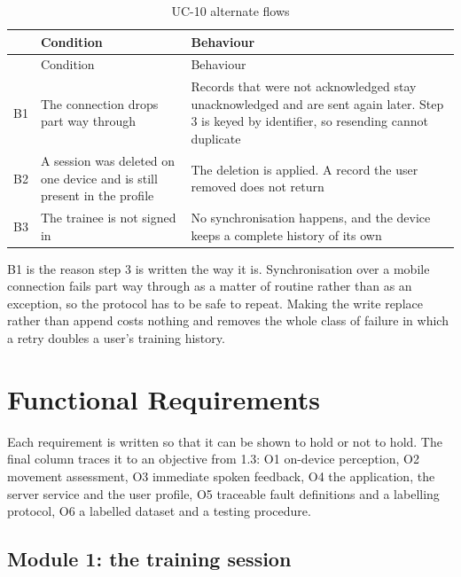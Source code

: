 {\small
\setlength{\LTpre}{6pt}\setlength{\LTpost}{8pt}
\begin{longtable}{>{\raggedright\arraybackslash}p{}>{\raggedright\arraybackslash}p{}>{\raggedright\arraybackslash}p{}}
\caption{UC-10 alternate flows}\\
\toprule
 & Condition & Behaviour \\
\midrule
\endfirsthead
\toprule
 & Condition & Behaviour \\
\midrule
\endhead
\bottomrule
\endfoot
\bottomrule
\endlastfoot
B1 & The connection drops part way through & Records that were not acknowledged stay unacknowledged and are sent again later. Step 3 is keyed by identifier, so resending cannot duplicate \\
B2 & A session was deleted on one device and is still present in the profile & The deletion is applied. A record the user removed does not return \\
B3 & The trainee is not signed in & No synchronisation happens, and the device keeps a complete history of its own \\
\end{longtable}
}

B1 is the reason step 3 is written the way it is. Synchronisation over a mobile connection fails part way through as a matter of routine rather than as an exception, so the protocol has to be safe to repeat. Making the write replace rather than append costs nothing and removes the whole class of failure in which a retry doubles a user's training history.

\section{Functional Requirements}
\label{sec:3.3}

Each requirement is written so that it can be shown to hold or not to hold. The final column traces it to an objective from 1.3: O1 on-device perception, O2 movement assessment, O3 immediate spoken feedback, O4 the application, the server service and the user profile, O5 traceable fault definitions and a labelling protocol, O6 a labelled dataset and a testing procedure.

\subsection{Module 1: the training session}
\label{sec:3.3.1}

